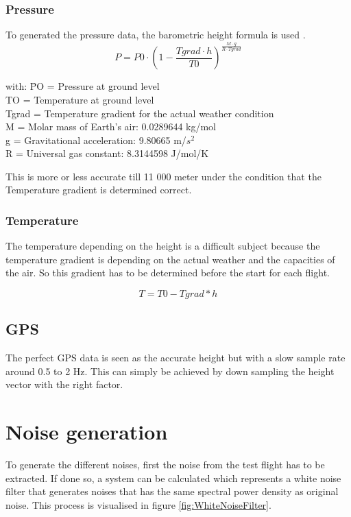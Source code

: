   \subsubsection{Pressure}
  To generated the pressure data, the barometric height formula is used \cite{NASAEarthAtmosphereModel2015}.
  $$P = P0 \cdot (1- \frac{Tgrad\cdot h}{T0})^{\frac{M\cdot g}{R\cdot Tgrad}}$$
  \begin{tabbing}
  with: \= PO = Pressure at ground level \\
  \> TO = Temperature at ground level \\
  \> Tgrad = Temperature gradient for the actual weather condition \\
  \> M = Molar mass of Earth's air: 0.0289644 kg/mol\\
  \> g = Gravitational acceleration: 9.80665 m/$s^2$\\
  \> R = Universal gas constant: 8.3144598 J/mol/K\\
  \end{tabbing}

  This is more or less accurate till 11 000 meter under the condition that the Temperature gradient is determined correct. 

  \subsubsection{Temperature}
  The temperature depending on the height is a difficult subject because the temperature gradient is depending on the actual weather and the capacities of the air.
  So this gradient has to be determined before the start for each flight.

  $$T = T0 - Tgrad*h$$
  
  \subsection{GPS}
  The perfect GPS data is seen as the accurate height but with a slow sample rate around 0.5 to 2 Hz.
  This can simply be achieved by down sampling the height vector with the right factor.
  
  \section{Noise generation}
  To generate the different noises, first the noise from the test flight has to be extracted.
  If done so, a system can be calculated which represents a white noise filter that generates noises
  that has the same spectral power density as original noise. This process is visualised in figure \ref{fig:WhiteNoiseFilter}.
  
